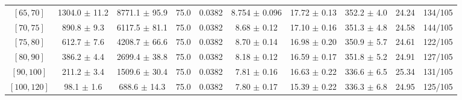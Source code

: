 \begin{tabular}{c||c|c|c|c|c|c|c||c|c}
$[65, 70]$ & 1304.0 $\pm$ 11.2 & 8771.1 $\pm$ 95.9 & 75.0 & 0.0382 & 8.754 $\pm$ 0.096 & 17.72 $\pm$ 0.13 & 352.2 $\pm$ 4.0 & 24.24 & 134/105\\
$[70, 75]$ & 890.8 $\pm$ 9.3 & 6117.5 $\pm$ 81.1 & 75.0 & 0.0382 & 8.68 $\pm$ 0.12 & 17.10 $\pm$ 0.16 & 351.3 $\pm$ 4.8 & 24.58 & 144/105\\
$[75, 80]$ & 612.7 $\pm$ 7.6 & 4208.7 $\pm$ 66.6 & 75.0 & 0.0382 & 8.70 $\pm$ 0.14 & 16.98 $\pm$ 0.20 & 350.9 $\pm$ 5.7 & 24.61 & 122/105\\
$[80, 90]$ & 386.2 $\pm$ 4.4 & 2699.4 $\pm$ 38.8 & 75.0 & 0.0382 & 8.18 $\pm$ 0.12 & 16.59 $\pm$ 0.17 & 351.8 $\pm$ 5.2 & 24.91 & 127/105\\
$[90, 100]$ & 211.2 $\pm$ 3.4 & 1509.6 $\pm$ 30.4 & 75.0 & 0.0382 & 7.81 $\pm$ 0.16 & 16.63 $\pm$ 0.22 & 336.6 $\pm$ 6.5 & 25.34 & 131/105\\
$[100, 120]$ & 98.1 $\pm$ 1.6 & 688.6 $\pm$ 14.3 & 75.0 & 0.0382 & 7.80 $\pm$ 0.17 & 15.39 $\pm$ 0.22 & 336.3 $\pm$ 6.8 & 24.95 & 125/105\\
\end{tabular}
